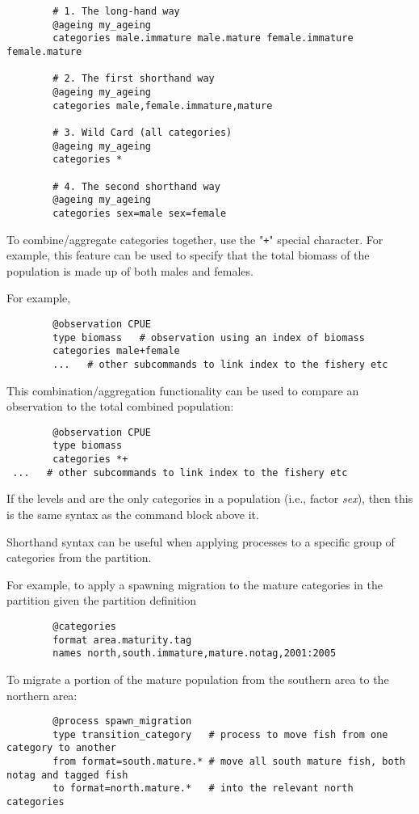 {\small{\begin{verbatim}
		# 1. The long-hand way
		@ageing my_ageing
		categories male.immature male.mature female.immature female.mature

		# 2. The first shorthand way
		@ageing my_ageing
		categories male,female.immature,mature

		# 3. Wild Card (all categories)
		@ageing my_ageing
		categories *

		# 4. The second shorthand way
		@ageing my_ageing
		categories sex=male sex=female
\end{verbatim}}}
\fi
To combine/aggregate categories together, use the "\texttt{+}" special character. For example, this feature can be used to specify that the total biomass of the population is made up of both males and females.

For example,

{\small{\begin{verbatim}
		@observation CPUE
		type biomass   # observation using an index of biomass
		categories male+female
        ...   # other subcommands to link index to the fishery etc
\end{verbatim}}}

This combination/aggregation functionality can be used to compare an observation to the total combined population:

{\small{\begin{verbatim}
		@observation CPUE
		type biomass
		categories *+
 ...   # other subcommands to link index to the fishery etc
		\end{verbatim}}}

If the levels  and  are the only categories in a population (i.e., factor \textit{sex}), then this is the same syntax as the command block above it.

Shorthand syntax can be useful when applying processes to a specific group of categories from the partition.

For example, to apply a spawning migration to the mature categories in the partition given the partition definition

{\small{\begin{verbatim}
		@categories
		format area.maturity.tag
		names north,south.immature,mature.notag,2001:2005
\end{verbatim}}}

To migrate a portion of the mature population from the southern area to the northern area:

{\small{\begin{verbatim}
		@process spawn_migration
		type transition_category   # process to move fish from one category to another
		from format=south.mature.* # move all south mature fish, both notag and tagged fish
		to format=north.mature.*   # into the relevant north categories
\end{verbatim}}}

